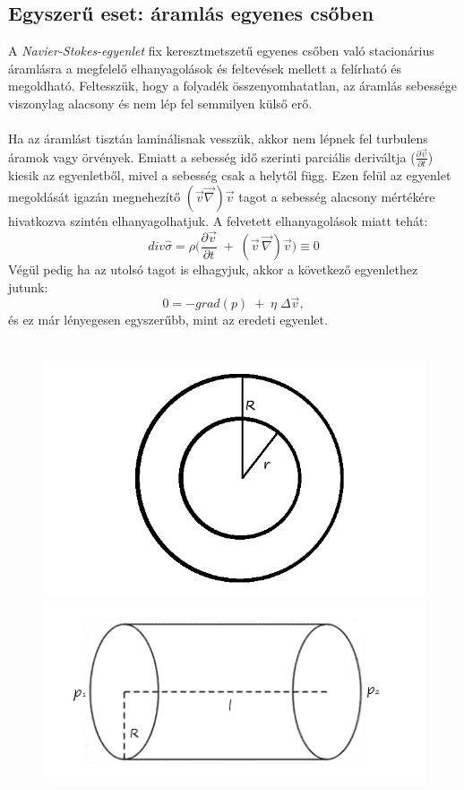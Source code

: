 \documentclass[a4paper, titlepage]{article}
\begin{document}
\subsection*{Egyszerű eset: áramlás egyenes csőben}
A \textit{Navier-Stokes-egyenlet} fix keresztmetszetű egyenes csőben való stacionárius áramlásra a megfelelő elhanyagolások és feltevések mellett a felírható és megoldható. Feltesszük, hogy a folyadék összenyomhatatlan, az áramlás sebessége viszonylag alacsony és nem lép fel semmilyen külső erő.\\\\
Ha az áramlást tisztán laminálisnak vesszük, akkor nem lépnek fel turbulens áramok vagy örvények. Emiatt a sebesség idő szerinti parciális deriváltja ($\frac{\partial\vec{v}}{\partial t}$) kiesik az egyenletből, mivel a sebesség csak a helytől függ. Ezen felül az egyenlet megoldását igazán megnehezítő $(\vec{v}\vec{\nabla})\vec{v}$ tagot a sebesség alacsony mértékére hivatkozva szintén elhanyagolhatjuk. A felvetett elhanyagolások miatt tehát:
\begin{equation}
div\hat{\sigma}=\rho\bigg(\frac{\partial \vec{v}}{\partial t}\;+\; (\vec{v}\,\vec{\nabla})\vec{v}\bigg)\equiv 0
\end{equation}
Végül pedig ha az utolsó tagot is elhagyjuk, akkor a következő egyenlethez jutunk:
\begin{equation}
0=-grad(p)\;+\;\eta\;\Delta\vec{v},
\end{equation}
és ez már lényegesen egyszerűbb, mint az eredeti egyenlet.\\\\
\begin{figure}[h]
\includegraphics[scale=0.3]{Front.png}
\quad
\includegraphics[scale=0.6]{Side.png}
\end{figure}
\end{document}
